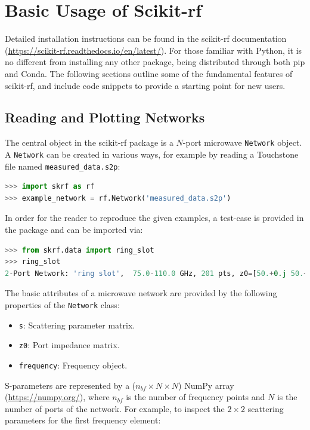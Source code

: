 \documentclass{IEEEjmw}
\begin{document}
\section{Basic Usage of Scikit-rf}

Detailed installation instructions can be found in the scikit-rf documentation (\url{https://scikit-rf.readthedocs.io/en/latest/}). For those familiar with Python, it is no different from installing any other package, being distributed through both pip and Conda. The following sections outline some of the fundamental features of scikit-rf, and include code snippets to provide a starting point for new users.

\subsection{Reading and Plotting Networks}
The central object in the scikit-rf package is a $N$-port microwave \texttt{Network} object. A \texttt{Network} can be created in various ways, for example by reading a Touchstone file named \texttt{measured\_data.s2p}:

\begin{lstlisting}[language=Python]
>>> import skrf as rf
>>> example_network = rf.Network('measured_data.s2p')
\end{lstlisting}

In order for the reader to reproduce the given examples, a test-case is provided in the package and can be imported via:

\begin{lstlisting}[language=Python]
>>> from skrf.data import ring_slot
>>> ring_slot
2-Port Network: 'ring slot',  75.0-110.0 GHz, 201 pts, z0=[50.+0.j 50.+0.j]
\end{lstlisting}

The basic attributes of a microwave network are provided by the following properties of the \texttt{Network} class:
\begin{itemize}
\item \texttt{s}: Scattering parameter matrix.
\item \texttt{z0}: Port impedance matrix.
\item \texttt{frequency}: Frequency object.
\end{itemize}

S-parameters are represented by a ($n_{bf} \times N \times N$) NumPy array \cite{harris2020} (\url{https://numpy.org/}), where $n_{bf}$ is the number of frequency points and $N$ is the number of ports of the network. For example, to inspect the $2 \times 2$ scattering parameters for the first frequency element:
\end{document}
